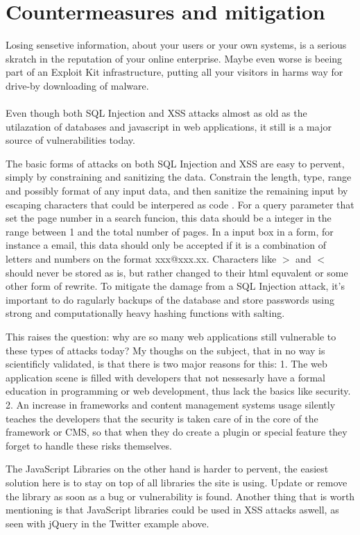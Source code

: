 \section{Countermeasures and mitigation}
Losing sensetive information, about your users or your own systems, is a serious skratch in the reputation of your online enterprise. Maybe even worse is beeing part of an Exploit Kit infrastructure, putting all your visitors in harms way for drive-by downloading of malware. 
\\ \\
Even though both SQL Injection and XSS attacks almost as old as the utilazation of databases and javascript in web applications, it still is a major source of vulnerabilities today. 

The basic forms of attacks on both SQL Injection and XSS are easy to pervent, simply by constraining and sanitizing the data. Constrain the length, type, range and possibly format of any input data, and then sanitize the remaining input by escaping characters that could be interpered as code \cite{Bisson2005}. For a query parameter that set the page number in a search funcion, this data should be a integer in the range between 1 and the total number of pages. In a input box in a form, for instance a email, this data should only be accepted if it is a combination of letters and numbers on the format xxx@xxx.xx. Characters like $>$ and $<$ should never be stored as is, but rather changed to their html equvalent or some other form of rewrite. To mitigate the damage from a SQL Injection attack, it's important to do ragularly backups of the database and store passwords using strong and computationally heavy hashing functions with salting.  

This raises the question: why are so many web applications still vulnerable to these types of attacks today? My thoughs on the subject, that in no way is scientificly validated, is that there is two major reasons for this: 1. The web application scene is filled with developers that not nessesarly have a formal education in programming or web development, thus lack the basics like security. 2. An increase in frameworks and content management systems usage silently teaches the developers that the security is taken care of in the core of the framework or CMS, so that when they do create a plugin or special feature they forget to handle these risks themselves.

The JavaScript Libraries on the other hand is harder to pervent, the easiest solution here is to stay on top of all libraries the site is using. Update or remove the library as soon as a bug or vulnerability is found. Another thing that is worth mentioning is that JavaScript libraries could be used in XSS attacks aswell, as seen with jQuery in the Twitter example above.


